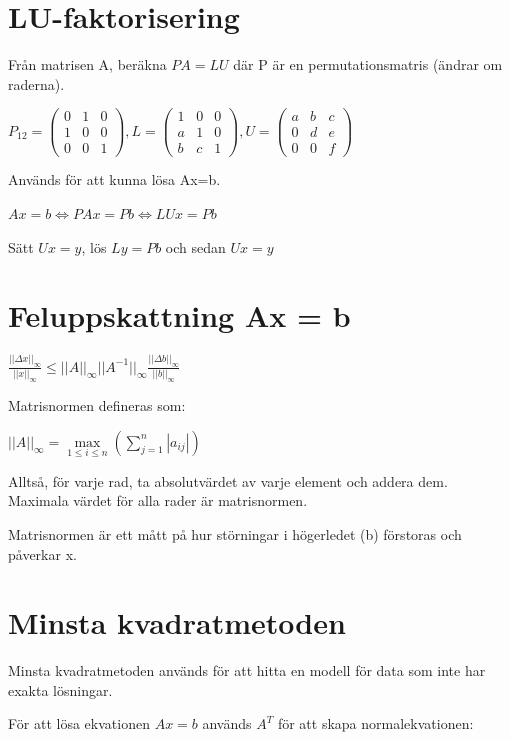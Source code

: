 \documentclass[12pt,a4paper]{article}
\begin{document}
\newpage
\section{LU-faktorisering}
Från matrisen A, beräkna $PA=LU$ där P är en permutationsmatris (ändrar om raderna).

$P_{12} =
\begin{pmatrix}
0 & 1 & 0 \\
1 & 0 & 0 \\
0 & 0 & 1
\end{pmatrix}
,
L =
\begin{pmatrix}
1 & 0 & 0 \\
a & 1 & 0 \\
b & c & 1
\end{pmatrix}
,
U =
\begin{pmatrix}
a & b & c \\
0 & d & e \\
0 & 0 & f
\end{pmatrix}
$

Används för att kunna lösa Ax=b.

$Ax = b \Leftrightarrow PAx = Pb \Leftrightarrow LUx = Pb$

Sätt $Ux = y$, lös $Ly = Pb$ och sedan $Ux = y$

\section{Feluppskattning Ax = b}
$\frac{||\Delta x||_\infty}{||x||_\infty} \leq ||A||_\infty ||A^{-1}||_\infty \frac{||\Delta b||_\infty}{||b||_\infty}$

Matrisnormen defineras som:

$ ||A||_\infty = \underset{1 \leq i \leq n}{\max} ( \sum_{j=1}^n |a_{ij}|)$

Alltså, för varje rad, ta absolutvärdet av varje element och addera dem. Maximala värdet för alla rader är matrisnormen.

Matrisnormen är ett mått på hur störningar i högerledet (b) förstoras och påverkar x.

\section{Minsta kvadratmetoden}
Minsta kvadratmetoden används för att hitta en modell för data som inte har exakta lösningar.

För att lösa ekvationen $ Ax = b$ används $A^T$ för att skapa normalekvationen:
\end{document}
